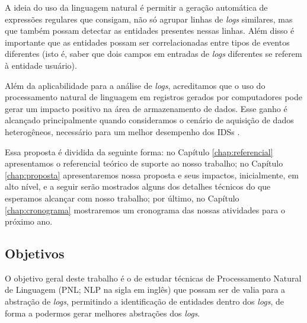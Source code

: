 \documentclass[
	12pt,				%
	openright,			%
	twoside,			%
	a4paper,			%
	english,			%
	spanish,			%
	brazil,				%
	]{abntex2}
\begin{document}
A ideia do uso da linguagem natural é permitir a geração automática de expressões regulares que consigam, não só agrupar linhas de \emph{logs} similares, mas que também possam detectar as entidades presentes nessas linhas. Além disso é importante que as entidades possam ser correlacionadas entre tipos de eventos diferentes (isto é, saber que dois campos em entradas de \emph{logs} diferentes se referem à entidade usuário).

Além da aplicabilidade para a análise de \emph{logs}, acreditamos que o uso do processamento natural de linguagem em registros gerados por computadores pode gerar um impacto positivo na área de armazenamento de dados. Esse ganho é alcançado principalmente quando consideramos o cenário de aquisição de dados heterogêneos, necessário para um melhor desempenho dos IDSs \cite{zuech2015intrusion}.

Essa proposta é dividida da seguinte forma: no Capítulo \ref{chap:referencial} apresentamos o referencial teórico de suporte ao nosso trabalho; no Capítulo \ref{chap:proposta} apresentaremos nossa proposta e seus impactos, inicialmente, em alto nível, e a seguir serão mostrados alguns dos detalhes técnicos do que esperamos alcançar com nosso trabalho; por último, no Capítulo \ref{chap:cronograma} mostraremos um cronograma das nossas atividades para o próximo ano.

\subsection{Objetivos}

O objetivo geral deste trabalho é o de estudar técnicas de Processamento Natural de Linguagem (PNL; NLP na sigla em inglês) que possam ser de valia para a abstração de \emph{logs}, permitindo a identificação de entidades dentro dos \emph{logs}, de forma a podermos gerar melhores abstrações dos \emph{logs}.
\end{document}
